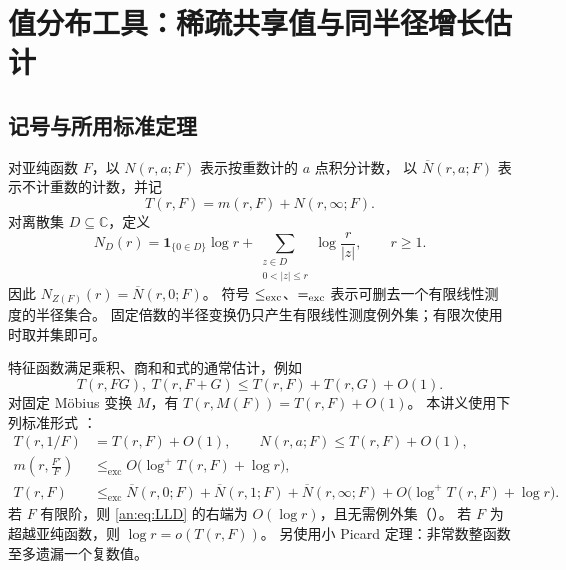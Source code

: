 \documentclass[11pt,a4paper,oneside,openany]{book}
\theoremstyle{lecture}
\newcommand{\C}{\mathbb C}
\newcommand{\excle}{\mathrel{\le_{\mathrm{exc}}}}
\newcommand{\bN}{\overline N}
\numberwithin{equation}{section}
\begin{document}
\section{值分布工具：稀疏共享值与同半径增长估计}\label{an:sec:tools}
\subsection{记号与所用标准定理}
对亚纯函数 $F$，以 $N(r,a;F)$ 表示按重数计的 $a$ 点积分计数，
以 $\bN(r,a;F)$ 表示不计重数的计数，并记
\[
 T(r,F)=m(r,F)+N(r,\infty;F).
\]
对离散集 $D\subseteq\C$，定义
\begin{equation}\label{an:eq:setcount}
 N_D(r)=\mathbf1_{\{0\in D\}}\log r+
 \sum_{\substack{z\in D\\0<|z|\le r}}\log\frac r{|z|},\qquad r\ge1.
\end{equation}
因此 $N_{Z(F)}(r)=\bN(r,0;F)$。
符号 $\le_{\rm exc}$、$=_{\rm exc}$ 表示可删去一个有限线性测度的半径集合。
固定倍数的半径变换仍只产生有限线性测度例外集；有限次使用时取并集即可。

特征函数满足乘积、商和和式的通常估计，例如
\[
 T(r,FG),\ T(r,F+G)\le T(r,F)+T(r,G)+O(1).
\]
对固定 Möbius 变换 $M$，有 $T(r,M(F))=T(r,F)+O(1)$。
本讲义使用下列标准形式 \cite{halburd,vojta}：
\begin{align}
 T(r,1/F)&=T(r,F)+O(1),\qquad N(r,a;F)\le T(r,F)+O(1),\label{an:eq:FMT}\\
 m\left(r,\frac{F'}F\right)&\excle
 O\bigl(\log^+T(r,F)+\log r\bigr),\label{an:eq:LLD}\\
 T(r,F)&\excle \bN(r,0;F)+\bN(r,1;F)+\bN(r,\infty;F)
 +O\bigl(\log^+T(r,F)+\log r\bigr).\label{an:eq:SMT}
\end{align}
若 $F$ 有限阶，则 \eqref{an:eq:LLD} 的右端为 $O(\log r)$，且无需例外集（\cite[定理7]{halburd}）。
若 $F$ 为超越亚纯函数，则 $\log r=o(T(r,F))$。
另使用小 Picard 定理：非常数整函数至多遗漏一个复数值。
\end{document}
